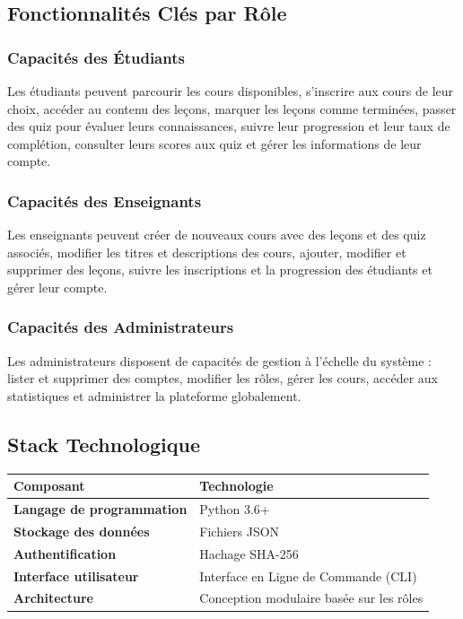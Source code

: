 \documentclass[12pt,a4paper]{article}
\begin{document}
\subsection{Fonctionnalités Clés par Rôle}

\subsubsection{Capacités des Étudiants}
Les étudiants peuvent parcourir les cours disponibles, s'inscrire aux cours de leur choix, accéder au contenu des leçons, marquer les leçons comme terminées, passer des quiz pour évaluer leurs connaissances, suivre leur progression et leur taux de complétion, consulter leurs scores aux quiz et gérer les informations de leur compte.

\subsubsection{Capacités des Enseignants}
Les enseignants peuvent créer de nouveaux cours avec des leçons et des quiz associés, modifier les titres et descriptions des cours, ajouter, modifier et supprimer des leçons, suivre les inscriptions et la progression des étudiants et gérer leur compte.

\subsubsection{Capacités des Administrateurs}
Les administrateurs disposent de capacités de gestion à l'échelle du système : lister et supprimer des comptes, modifier les rôles, gérer les cours, accéder aux statistiques et administrer la plateforme globalement.

\subsection{Stack Technologique}

\begin{center}
\begin{tabular}{>{\bfseries}l l}
\toprule
Composant & Technologie \\
\midrule
Langage de programmation & Python 3.6+ \\
Stockage des données & Fichiers JSON \\
Authentification & Hachage SHA-256 \\
Interface utilisateur & Interface en Ligne de Commande (CLI) \\
Architecture & Conception modulaire basée sur les rôles \\
\bottomrule
\end{tabular}
\end{center}
\end{document}

